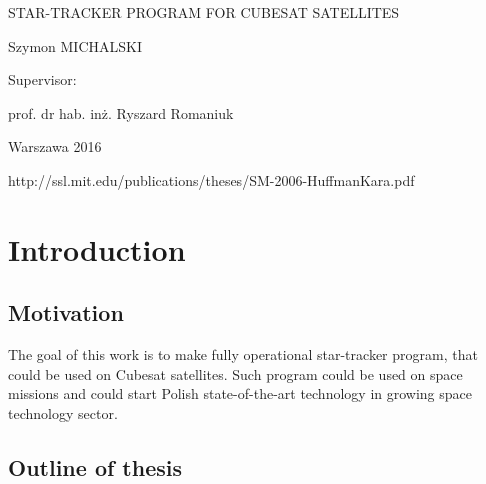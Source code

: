 \documentclass[12pt,a4paper,oneside]{article}
\begin{document}
\begin{titlepage}
	\vspace{0.2cm}
	{\huge STAR-TRACKER PROGRAM FOR CUBESAT SATELLITES\par}
	\vspace{0.2cm}
	{\large Szymon MICHALSKI\par}
	\vspace{3cm}
	\begin{flushright}
	Supervisor:\par
	prof. dr hab. inż. Ryszard Romaniuk\par
	\end{flushright}
	\vspace{6cm}
	{\large Warszawa 2016\par}
\end{titlepage}

\setcounter{page}{2}


\newpage
\setlength{\parindent}{1cm}
\setlength{\parskip}{\baselineskip}%


\printnomenclature

\newpage
http://ssl.mit.edu/publications/theses/SM-2006-HuffmanKara.pdf
\cite{jenssen2011comparison}
\cite{valenti2015keeping}
\cite{delabie2012highly}
\cite{jalabert2011optimization}
\cite{felikson2011orbit}
\cite{knutson2012fast}
\cite{rose2003star}
\cite{mortari2002starnav}


\section{Introduction}
\subsection{Motivation}
The goal of this work is to make fully operational star-tracker program, that could be used on Cubesat satellites. Such program could be used on space missions and could start Polish state-of-the-art technology in growing space technology sector.

\subsection{Outline of thesis}
\end{document}
